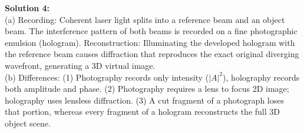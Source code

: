 \begin{solutionbox}
\vspace{0.3cm}
\textbf{Solution 4:}\\
(a) Recording: Coherent laser light splits into a reference beam and an object beam. The interference pattern of both beams is recorded on a fine photographic emulsion (hologram). Reconstruction: Illuminating the developed hologram with the reference beam causes diffraction that reproduces the exact original diverging wavefront, generating a 3D virtual image.\\
(b) Differences: (1) Photography records only intensity ($|A|^2$), holography records both amplitude and phase. (2) Photography requires a lens to focus 2D image; holography uses lensless diffraction. (3) A cut fragment of a photograph loses that portion, whereas every fragment of a hologram reconstructs the full 3D object scene.
\end{solutionbox}
